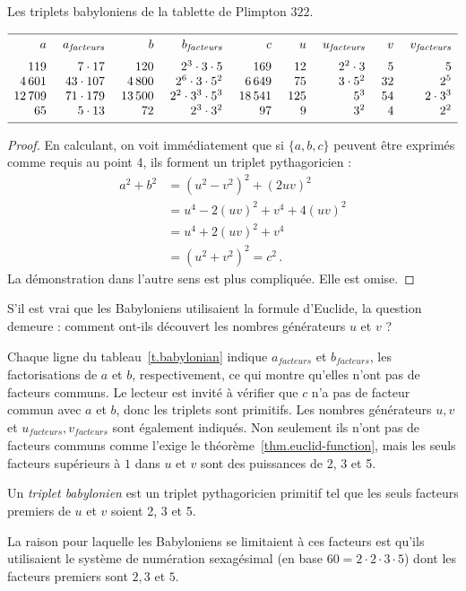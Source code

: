 \begin{table}[htbp]
\caption{Les triplets babyloniens de la tablette de Plimpton $322$.}\label{t.babylonian}
\footnotesize
\[
\begin{array}{r@{$\quad\ $}r@{$\quad\ $}r@{$\quad\ $}r@{$\quad\ $}r@{$\quad\ $}r@{$\quad\ $}r@{$\quad\ $}r@{$\quad\ $}r}
\hline
\noalign{\smallskip}
a&a_{\textit{facteurs}}&b&b_{\textit{facteurs}}&c&u&u_{\textit{facteurs}}&v&v_{\textit{facteurs}}\\
\noalign{\smallskip}\noalign{\smallskip}
119&7\cdot 17 &120&2^3 \cdot 3\cdot 5 & 169&12&2^2\cdot 3&5&5\\
4\,601 &43\cdot 107&4\,800&2^6 \cdot 3 \cdot 5^2& 6\,649&75&3\cdot 5^2&32&2^5\\
12\,709 &71\cdot 179&13\,500&2^2 \cdot 3^3 \cdot 5^3& 18\,541&125&5^3&54&2\cdot 3^3\\
65 &5\cdot 13&72&2^3 \cdot 3^2 & 97&9&3^2&4&2^2\\
\noalign{\smallskip}\hline
\end{array}\]
\end{table}

\begin{proof}
En calculant, on voit immédiatement que si $\{a,b,c\}$ peuvent être exprimés comme requis au point 4, ils forment un triplet pythagoricien :
\begin{align*}
a^2+b^2&=(u^2-v^2)^2 + (2uv)^2\\
&= u^4-2(uv)^2+v^4+4(uv)^2\\
&=u^4+2(uv)^2+v^4\\
&=(u^2+v^2)^2=c^2\,.
\end{align*}
La démonstration dans l'autre sens est plus compliquée. Elle est omise.
\end{proof}
S'il est vrai que les Babyloniens utilisaient la formule d'Euclide, la question demeure : comment ont-ils découvert les nombres générateurs $u$ et $v$ ?

Chaque ligne du tableau~\ref{t.babylonian} indique  $a_{\textit{facteurs}}$ et $b_{\textit{facteurs}}$, les factorisations de $a$ et $b$, respectivement, ce qui montre qu'elles n'ont pas de facteurs communs. Le lecteur est invité à vérifier que $c$ n'a pas de facteur commun avec $a$ et $b$,  donc les triplets sont primitifs. Les nombres générateurs $u,v$ et $u_{\textit{facteurs}}, v_{\textit{facteurs}}$ sont également indiqués. Non seulement ils n'ont pas de facteurs communs comme l'exige le théorème~\ref{thm.euclid-function}, mais les seuls facteurs supérieurs à $1$ dans $u$ et $v$ sont des puissances de 2, 3 et 5.
\begin{definition}
Un \emph{triplet babylonien} est un triplet pythagoricien primitif tel que les seuls facteurs premiers de $u$ et $v$ soient 2, 3 et 5.
\end{definition}
La raison pour laquelle les Babyloniens se limitaient à ces facteurs est qu'ils utilisaient le système de numération sexagésimal (en base $60=2\cdot 2\cdot 3\cdot 5$) dont les facteurs premiers sont $2,3$ et $5$.

